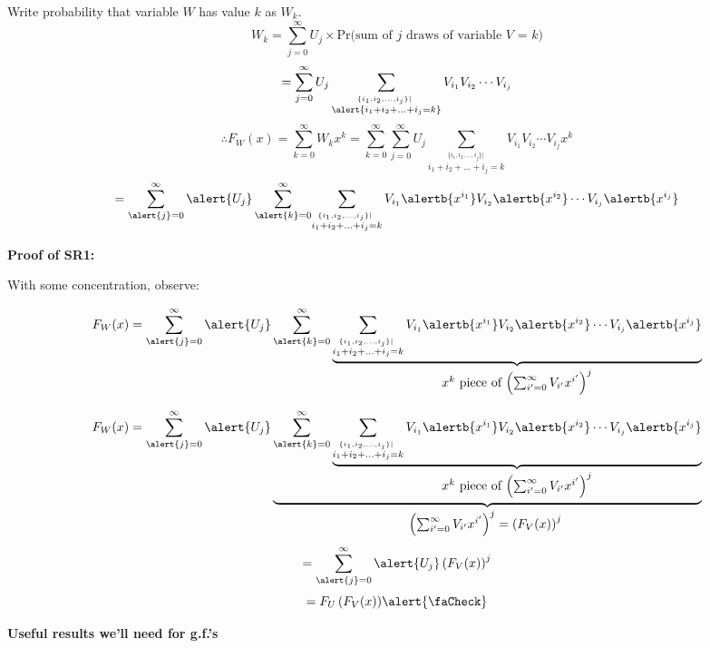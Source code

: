 \begin{frame}[label=]
\begin{frame}[label=]
\begin{frame}[label=]
\begin{frame}[label=]
\begin{frame}[label=]
\begin{frame}[label=]
\begin{frame}[label=]
\begin{frame}[label=]
\begin{frame}[label=]
\begin{frame}[label=]
\begin{frame}[label=]
\begin{frame}[label=rn-sneakyresult1]
\begin{frame}[label=]
  {
  Write probability that variable $W$ has value $k$ as \alert{$W_k$}.
}
  {
  $$
  W_k
  =
  \sum_{j=0}^{\infty} U_j \times%
  \mbox{Pr(sum of $j$ draws of variable $V$ = $k$)}
  $$
  }
  {
    $$
    =\sum_{j=0}^{\infty} U_j 
    \sum_{\stackrel{\{i_1, i_2, \ldots, i_j \} |\ }{\alert{i_1+i_2+\ldots+i_j = k}}} 
    V_{i_1} V_{i_2} \cdots V_{i_j}
    $$
  }
  $$
  {
    \therefore
    F_W(x) = \sum_{k=0}^\infty W_k x^k
  }
  {
    =
    \sum_{k=0}^\infty
    \sum_{j=0}^{\infty} U_j 
    \sum_{\stackrel{\{i_1, i_2, \ldots, i_j \} |\ }{{i_1+i_2+\ldots+i_j = k}}} 
    V_{i_1} V_{i_2} \cdots V_{i_j}
    x^k
  }
  $$  
  $$
  {
    =
    \sum_{\alert{j}=0}^{\infty} 
    \alert{U_j}
    \sum_{\alert{k}=0}^\infty
  }
  {
    \sum_{\stackrel{\{i_1, i_2, \ldots, i_j \} |\ }{{i_1+i_2+\ldots+i_j = k}}} 
    V_{i_1} \alertb{x^{i_1}}
    V_{i_2} \alertb{x^{i_2}}
    \cdots 
    V_{i_j} \alertb{x^{i_j}}
  }
  $$  


\begin{frame}[label=]
  \textbf{Proof of SR1:}

  With some concentration, observe:
    
  $$
  F_W(x) = 
  \sum_{\alert{j}=0}^{\infty} 
  \alert{U_j}
    \sum_{\alert{k}=0}^\infty
    \underbrace{
    \sum_{\stackrel{\{i_1, i_2, \ldots, i_j \} |\ }{{i_1+i_2+\ldots+i_j = k}}} 
    V_{i_1} \alertb{x^{i_1}}
    V_{i_2} \alertb{x^{i_2}}
    \cdots 
    V_{i_j} \alertb{x^{i_j}}
  }_{
    \mbox{$x^k$ piece of $\left( \sum_{i'=0}^\infty V_{i'}x^{i'}\right)^j$}
  }
  $$
  
  $$
  F_W(x) = 
  \sum_{\alert{j}=0}^{\infty} 
  \alert{U_j}
  \underbrace{
    \sum_{\alert{k}=0}^\infty
    \underbrace{
      \sum_{\stackrel{\{i_1, i_2, \ldots, i_j \} |\ }{{i_1+i_2+\ldots+i_j = k}}} 
      V_{i_1} \alertb{x^{i_1}}
      V_{i_2} \alertb{x^{i_2}}
      \cdots 
      V_{i_j} \alertb{x^{i_j}}
    }_{ %
      \mbox{$x^k$ piece of $\left( \sum_{i'=0}^\infty V_{i'}x^{i'}\right)^j$}
    }
  }_{ %
    \mbox{$\left( \sum_{i'=0}^{\infty} V_{i'}x^{i'}\right)^j = \left(F_V(x) \right)^j$ }
  } 
  $$
    {
    $$
    =
  \sum_{\alert{j}=0}^{\infty} 
  \alert{U_j}
  \left( F_V(x) \right)^j
    $$
  }
  $$
  {
    =
    F_U \left( F_V(x) \right)
  }
  {
  \alert{\faCheck}
  }
  $$


\begin{frame}[label=rn-sneakyresult2]
  \textbf{Useful results we'll need for g.f.'s}


\end{frame}
\end{frame}
\end{frame}
\end{frame}
\end{frame}
\end{frame}
\end{frame}
\end{frame}
\end{frame}
\end{frame}
\end{frame}
\end{frame}
\end{frame}
\end{frame}
\end{frame}
